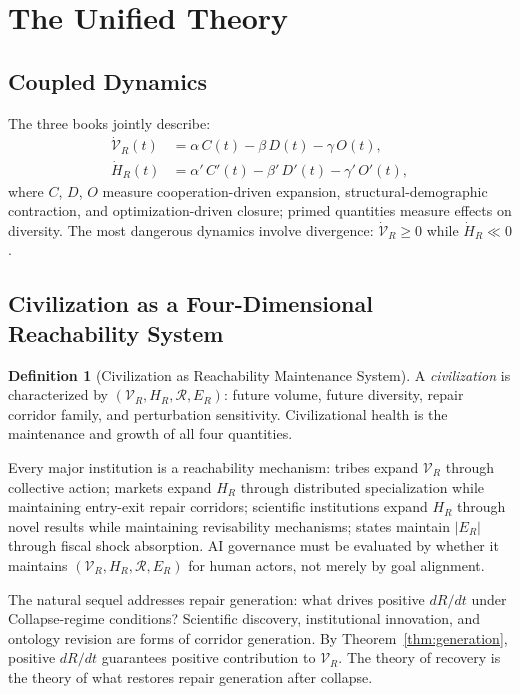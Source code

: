 \documentclass[12pt, a4paper]{article}
\theoremstyle{plain}
\theoremstyle{definition}
\newtheorem{definition}{Definition}
\theoremstyle{remark}
\begin{document}
\section{The Unified Theory}

\subsection{Coupled Dynamics}

The three books jointly describe:
\begin{align*}
\dot{\mathcal{V}}_R(t) &= \alpha\, C(t) - \beta\, D(t) - \gamma\, O(t), \\
\dot{H}_R(t) &= \alpha'\, C'(t) - \beta'\, D'(t) - \gamma'\, O'(t),
\end{align*}
where $C$, $D$, $O$ measure cooperation-driven expansion, structural-demographic contraction, and optimization-driven closure; primed quantities measure effects on diversity. The most dangerous dynamics involve divergence: $\dot{\mathcal{V}}_R \geq 0$ while $\dot{H}_R \ll 0$.

\subsection{Civilization as a Four-Dimensional Reachability System}

\begin{definition}[Civilization as Reachability Maintenance System]
A \emph{civilization} is characterized by $(\mathcal{V}_R, H_R, \mathcal{R}, E_R)$: future volume, future diversity, repair corridor family, and perturbation sensitivity. Civilizational health is the maintenance and growth of all four quantities.
\end{definition}

Every major institution is a reachability mechanism: tribes expand $\mathcal{V}_R$ through collective action; markets expand $H_R$ through distributed specialization while maintaining entry-exit repair corridors; scientific institutions expand $H_R$ through novel results while maintaining revisability mechanisms; states maintain $|E_R|$ through fiscal shock absorption. AI governance must be evaluated by whether it maintains $(\mathcal{V}_R, H_R, \mathcal{R}, E_R)$ for human actors, not merely by goal alignment.

The natural sequel addresses repair generation: what drives positive $dR/dt$ under Collapse-regime conditions? Scientific discovery, institutional innovation, and ontology revision are forms of corridor generation. By Theorem~\ref{thm:generation}, positive $dR/dt$ guarantees positive contribution to $\mathcal{V}_R$. The theory of recovery is the theory of what restores repair generation after collapse.
\end{document}
